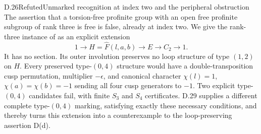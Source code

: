 \begin{claim}{D.26}{Refuted}{Unmarked recognition at index two and the peripheral obstruction}
The assertion that a torsion-free profinite group with an open
free profinite subgroup of rank three is free is false, already
at index two. We give the rank-three instance of
\cite[Proposition, pp.~350--352]{A-Haran1985} as an explicit
extension
\[
 1\longrightarrow H=\widehat F(l,a,b)
   \longrightarrow E\longrightarrow C_2\longrightarrow1.
                                                               \tag{D.26a}
\]
It has no section. Its outer involution preserves no loop
structure of type $(1,2)$ on $H$. Every preserved type-$(0,4)$
structure would have a double-transposition cusp permutation,
multiplier $-\epsilon$, and canonical character
$\chi(l)=1$, $\chi(a)=\chi(b)=-1$ sending all four cusp
generators to $-1$. Two explicit type-$(0,4)$ candidates fail,
with finite $S_3$ and $S_4$ certificates. D.29 supplies a
different complete type-$(0,4)$ marking, satisfying exactly
these necessary conditions, and thereby turns this extension
into a counterexample to the loop-preserving assertion D(d).
\end{claim}
